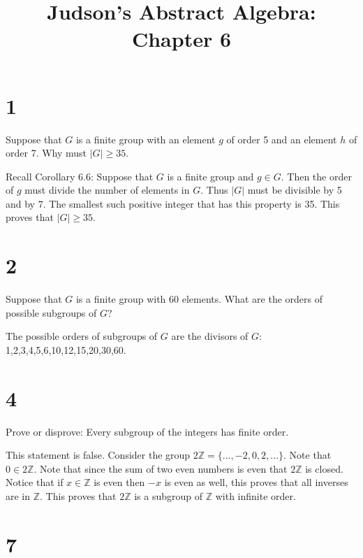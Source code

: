 \documentclass[a4paper]{article}
\title{Judson's Abstract Algebra: Chapter 6}
\date{}
\begin{document}
\maketitle

\section*{1}

Suppose that $G$ is a finite group with an element $g$ of order 5 and an element $h$ of order 7. Why must $|G| \geq 35$.

\vspace{\baselineskip}

Recall Corollary 6.6: Suppose that $G$ is a finite group and $g \in G$. Then the order of $g$ must divide the number of elements in $G$. Thus $|G|$ must be divisible by 5 and by 7. The smallest such positive integer that has this property is 35. This proves that $|G| \geq 35$.


\section*{2}

Suppose that $G$ is a finite group with 60 elements. What are the orders of possible subgroups of $G$?

\vspace{\baselineskip}

The possible orders of subgroups of $G$ are the divisors of $G$: 1,2,3,4,5,6,10,12,15,20,30,60.


\section*{4}

Prove or disprove: Every subgroup of the integers has finite order.

\vspace*{\baselineskip}

This statement is false. Consider the group $2\mathbb{Z} = \{ ..., -2, 0, 2, ... \}$. Note that $0 \in 2\mathbb{Z}$. Note that since the sum of two even numbers is even that $2\mathbb{Z}$ is closed. Notice that if $x \in \mathbb{Z}$ is even then $-x$ is even as well, this proves that all inverses are in $\mathbb{Z}$. This proves that $2\mathbb{Z}$ is a subgroup of $\mathbb{Z}$ with infinite order.


\section*{7}
\end{document}
